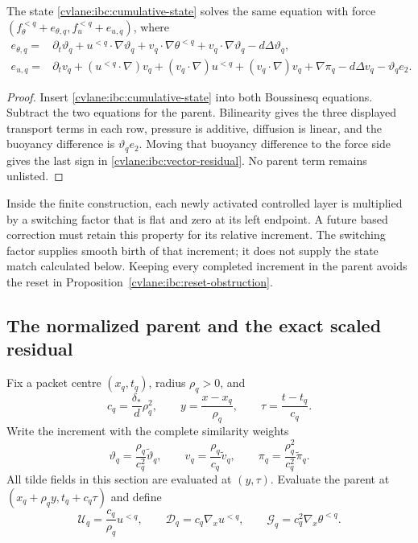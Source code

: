 \begin{cvlaneproposition}\label{cvlane:ibc:physical-residual}
The state \eqref{cvlane:ibc:cumulative-state} solves the same equation with force
$(f_\theta^{<q}+e_{\theta,q},f_u^{<q}+e_{u,q})$, where
\begin{align}
 e_{\theta,q}={}&\partial_t\vartheta_q
  +u^{<q}\!\cdot\nabla\vartheta_q
  +v_q\!\cdot\nabla\theta^{<q}
  +v_q\!\cdot\nabla\vartheta_q-d\Delta\vartheta_q,
 \label{cvlane:ibc:scalar-residual}\\
 e_{u,q}={}&\partial_tv_q+(u^{<q}\!\cdot\nabla)v_q
 +(v_q\!\cdot\nabla)u^{<q}+(v_q\!\cdot\nabla)v_q
 +\nabla\pi_q-d\Delta v_q-\vartheta_qe_2.
 \label{cvlane:ibc:vector-residual}
\end{align}
\end{cvlaneproposition}

\begin{proof}
Insert \eqref{cvlane:ibc:cumulative-state} into both Boussinesq equations.
Subtract the two equations for the parent.  Bilinearity gives the three
displayed transport terms in each row, pressure is additive, diffusion is
linear, and the buoyancy difference is $\vartheta_qe_2$.  Moving that
buoyancy difference to the force side gives the last sign in
\eqref{cvlane:ibc:vector-residual}.  No parent term remains unlisted.
\end{proof}

Inside the finite construction, each newly activated controlled layer is
multiplied by a switching factor that is flat and zero at its left endpoint.
A future based correction must retain this property for its relative
increment.  The switching factor supplies smooth birth of that increment; it
does not supply the state match calculated below.  Keeping every completed
increment in the parent avoids the reset in
Proposition~\ref{cvlane:ibc:reset-obstruction}.

\subsection{The normalized parent and the exact scaled residual}

Fix a packet centre $(x_q,t_q)$, radius $\rho_q>0$, and
\begin{equation}\label{cvlane:ibc:clock}
 c_q=\frac{\delta_*}{d}\rho_q^2,\qquad
 y=\frac{x-x_q}{\rho_q},\qquad
 \tau=\frac{t-t_q}{c_q}.
\end{equation}
Write the increment with the complete similarity weights
\begin{equation}\label{cvlane:ibc:increment-map}
 \vartheta_q=\frac{\rho_q}{c_q^2}\widetilde\vartheta_q,\qquad
 v_q=\frac{\rho_q}{c_q}\widetilde v_q,\qquad
 \pi_q=\frac{\rho_q^2}{c_q^2}\widetilde\pi_q.
\end{equation}
All tilde fields in this section are evaluated at $(y,\tau)$.  Evaluate the
parent at $(x_q+\rho_qy,t_q+c_q\tau)$ and define
\begin{equation}\label{cvlane:ibc:parent-map}
 \mathcal U_q=\frac{c_q}{\rho_q}u^{<q},\qquad
 \mathcal D_q=c_q\nabla_xu^{<q},\qquad
 \mathcal G_q=c_q^2\nabla_x\theta^{<q}.
\end{equation}

